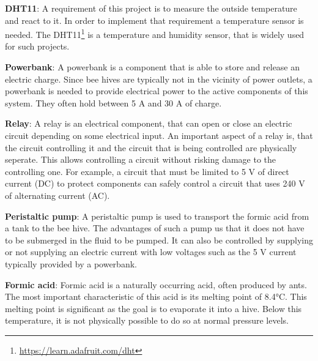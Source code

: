 \textbf{DHT11}: A requirement of this project is to measure the outside temperature and react to it.
In order to implement that requirement a temperature sensor is needed.
The DHT11\footnote{\url{https://learn.adafruit.com/dht}} is a temperature and humidity sensor, that is widely used for such projects.

\textbf{Powerbank}: A powerbank is a component that is able to store and release an electric charge.
Since bee hives are typically not in the vicinity of power outlets, a powerbank is needed to provide electrical power to the active components of this system.
They often hold between 5 A and 30 A of charge.

\textbf{Relay}: A relay is an electrical component, that can open or close an electric circuit depending on some electrical input.
An important aspect of a relay is, that the circuit controlling it and the circuit that is being controlled are physically seperate.
This allows controlling a circuit without risking damage to the controlling one.
For example, a circuit that must be limited to 5 V of direct current (DC) to protect components can safely control a circuit that uses 240 V of alternating current (AC).

\textbf{Peristaltic pump}: A peristaltic pump is used to transport the formic acid from a tank to the bee hive.
The advantages of such a pump us that it does not have to be submerged in the fluid to be pumped.
It can also be controlled by supplying or not supplying an electric current with low voltages such as the 5 V current typically provided by a powerbank.

\textbf{Formic acid}: Formic acid is a naturally occurring acid, often produced by ants.
The most important characteristic of this acid is its melting point of 8.4°C\cite{FormicAcid}.
This melting point is significant as the goal is to evaporate it into a hive.
Below this temperature, it is not physically possible to do so at normal pressure levels.